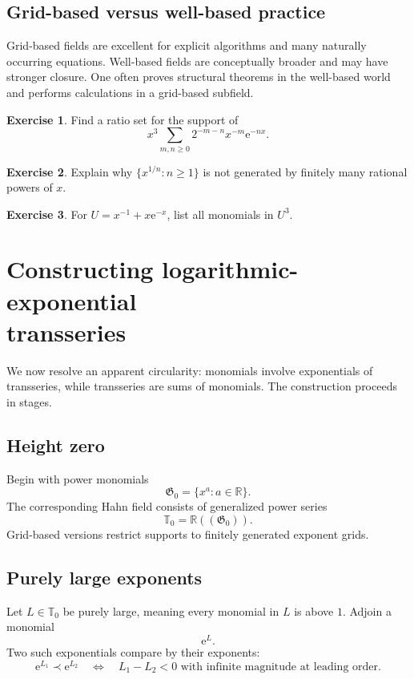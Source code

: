 \documentclass[11pt,oneside,openany]{book}
\newcommand{\R}{\mathbb{R}}
\newcommand{\T}{\mathbb{T}}
\newcommand{\G}{\mathfrak{G}}
\newcommand{\e}{\mathrm{e}}
\theoremstyle{plain}
\theoremstyle{definition}
\newtheorem{exercise}{Exercise}[chapter]
\theoremstyle{remark}
\begin{document}
\section{Grid-based versus well-based practice}
Grid-based fields are excellent for explicit algorithms and many naturally occurring equations. Well-based fields are conceptually broader and may have stronger closure. One often proves structural theorems in the well-based world and performs calculations in a grid-based subfield.

\begin{exercise}
Find a ratio set for the support of
\[
  x^3\sum_{m,n\ge0}2^{-m-n}x^{-m}\e^{-nx}.
\]
\end{exercise}

\begin{exercise}
Explain why $\{x^{1/n}:n\ge1\}$ is not generated by finitely many rational powers of $x$.
\end{exercise}

\begin{exercise}
For $U=x^{-1}+x\e^{-x}$, list all monomials in $U^3$.
\end{exercise}


\chapter[Constructing logarithmic-exponential transseries]{Constructing logarithmic-exponential\\transseries}
\label{ch:construction}

We now resolve an apparent circularity: monomials involve exponentials of transseries, while transseries are sums of monomials. The construction proceeds in stages.

\section{Height zero}
Begin with power monomials
\[
  \G_0=\{x^a:a\in\R\}.
\]
The corresponding Hahn field consists of generalized power series
\[
  \T_0=\R((\G_0)).
\]
Grid-based versions restrict supports to finitely generated exponent grids.

\section{Purely large exponents}
Let $L\in\T_0$ be purely large, meaning every monomial in $L$ is above $1$. Adjoin a monomial
\[
  \e^L.
\]
Two such exponentials compare by their exponents:
\[
  \e^{L_1}\prec\e^{L_2}
  \quad\Longleftrightarrow\quad
  L_1-L_2<0\text{ with infinite magnitude at leading order}.
\]
\end{document}
